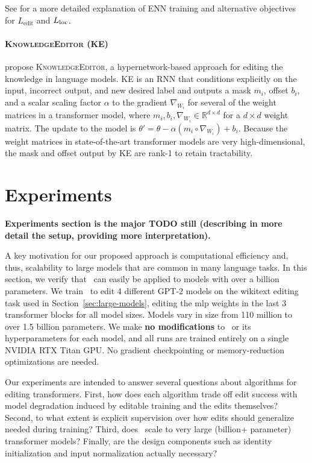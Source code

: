 \documentclass{article}
\begin{document}
See \citet{Sinitsin2020Editable} for a more detailed explanation of ENN training and alternative objectives for $ L_\text{edit}$ and $ L_\text{loc}$.

\paragraph{\textsc{KnowledgeEditor} (KE)}
\cite{Cao2021EditingFK} propose \textsc{KnowledgeEditor}, a hypernetwork-based approach for editing the knowledge in language models. KE is an RNN that conditions explicitly on the input, incorrect output, and new desired label and outputs a mask $m_i$, offset $b_i$, and a scalar scaling factor $\alpha$ to the gradient $\nabla_{W_i}$ for several of the weight matrices in a transformer model, where $m_i,b_i,\nabla_{W_i} \in \mathbb{R}^{d \times d}$ for a $d \times d$ weight matrix. The update to the model is $\theta' = \theta - \alpha (m_i \circ \nabla_{W_i}) + b_i$. Because the weight matrices in state-of-the-art transformer models are very high-dimensional, the mask and offset output by KE are rank-1 to retain tractability.

\section{Experiments}


\textbf{Experiments section is the major TODO still (describing in more detail the setup, providing more interpretation).}

A key motivation for our proposed approach is computational efficiency and, thus, scalability to large models that are common in many language tasks. In this section, we verify that \name~can easily be applied to models with over a billion parameters. We train \name~to edit 4 different GPT-2 models on the wikitext editing task used in Section~\ref{sec:large-models}, editing the mlp weights in the last 3 transformer blocks for all model sizes. Models vary in size from 110 million to over 1.5 billion parameters. We make \textbf{no modifications} to \name~or its hyperparameters for each model, and all runs are trained entirely on a single NVIDIA RTX Titan GPU. No gradient checkpointing or memory-reduction optimizations are needed.

Our experiments are intended to answer several questions about algorithms for editing transformers. First, how does each algorithm trade off edit success with model degradation induced by editable training and the edits themselves? Second, to what extent is explicit supervision over how edits should generalize needed during training? Third, does \name~scale to very large (billion+ parameter) transformer models? Finally, are the design components such as identity initialization and input normalization actually necessary?
\end{document}
